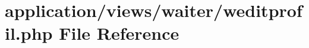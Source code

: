 \hypertarget{weditprofil_8php}{}\section{application/views/waiter/weditprofil.php File Reference}
\label{weditprofil_8php}
